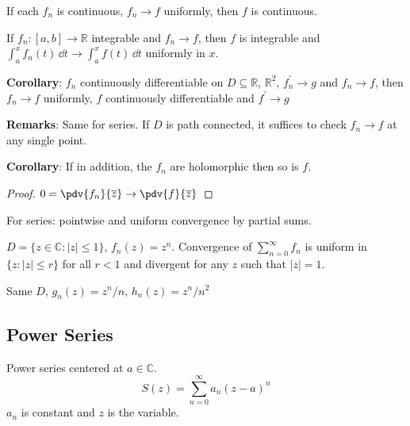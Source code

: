 \documentclass{report}
\begin{document}
\begin{theorem}{}
    If each $f_{n}$ is continuous, $f_{n} \rightarrow f$ uniformly, then $f$ is continuous.
\end{theorem} 

\begin{theorem}{}
    If $f_{n} : [a, b] \rightarrow \mathbb{R}$ integrable and $f_{n} \rightarrow f$, then $f$ is integrable and $\int_{a}^{x} f_{n}(t) \, \dd{t}  \rightarrow \int_{a}^{x} f(t) \, \dd{t} $ uniformly in $x$.
\end{theorem}

\textbf{Corollary}: $f_{n}$ continuously differentiable on $D \subseteq \mathbb{R}$, $\mathbb{R}^{2}$, $f^{\prime}_{n} \rightarrow g$ and $f_{n} \rightarrow f$, then $f_{n} \rightarrow f$ uniformly, $f$ continuously differentiable and $f^{\prime} \rightarrow g$

\textbf{Remarks}: Same for series. If $D$ is path connected, it suffices to check $f_{n} \rightarrow f$ at any single point.

\textbf{Corollary}: If in addition, the $f_{n}$ are holomorphic then so is $f$.
    \begin{proof}
        $0 = \pdv{f_{n}}{\overline{z}} \rightarrow \pdv{f}{\overline{z}}$
    \end{proof}

For series: pointwise and uniform convergence by partial sums.

\begin{examples}
    \begin{example}
        $D = \{z \in \mathbb{C} : \lvert z \rvert \leq 1\}$, $f_{n} (z) = z^{n}$. Convergence of $\sum_{n = 0}^{\infty} f_{n}$ is uniform in $\{z : \lvert z \rvert \leq r\}$ for all $r < 1$ and divergent for any $z$ such that $\lvert z \rvert = 1$.
    \end{example}
    \begin{example}
        Same $D$, $g_{n}(z) = z^{n}/n$, $h_{n}(z) = z^{n}/n^{2}$
    \end{example}
\end{examples}

\begin{topic}
    \section{Power Series}
\end{topic}

Power series centered at $a \in \mathbb{C}$. 
    \begin{equation*}
        S(z) = \sum_{n = 0}^{\infty}a_{n}(z - a)^{n}
    \end{equation*}
$a_{n}$ is constant and $z$ is the variable.
\end{document}
